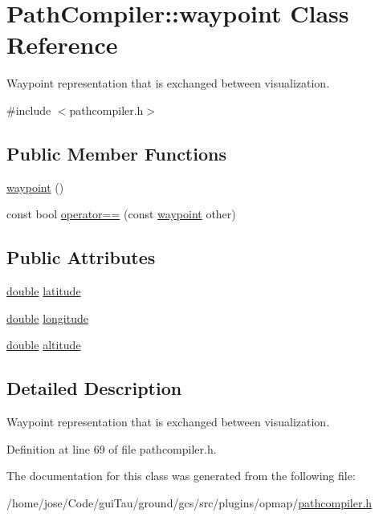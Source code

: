 \hypertarget{class_path_compiler_1_1waypoint}{\section{Path\-Compiler\-:\-:waypoint Class Reference}
\label{class_path_compiler_1_1waypoint}
}


Waypoint representation that is exchanged between visualization.  




{\ttfamily \#include $<$pathcompiler.\-h$>$}

\subsection*{Public Member Functions}
\begin{DoxyCompactItemize}
\item 
\hyperlink{group___o_p_map_plugin_ga9cfe5fa7f47eec99c5410789c9a6fea2}{waypoint} ()
\item 
const bool \hyperlink{group___o_p_map_plugin_ga2f0a3339103075c67e70706180c208e2}{operator==} (const \hyperlink{class_path_compiler_1_1waypoint}{waypoint} other)
\end{DoxyCompactItemize}
\subsection*{Public Attributes}
\begin{DoxyCompactItemize}
\item 
\hyperlink{_super_l_u_support_8h_a8956b2b9f49bf918deed98379d159ca7}{double} \hyperlink{group___o_p_map_plugin_ga78f3936ec843f0060648b9503702acd6}{latitude}
\item 
\hyperlink{_super_l_u_support_8h_a8956b2b9f49bf918deed98379d159ca7}{double} \hyperlink{group___o_p_map_plugin_ga698954b834d77d2eb539e287bc6bc9e0}{longitude}
\item 
\hyperlink{_super_l_u_support_8h_a8956b2b9f49bf918deed98379d159ca7}{double} \hyperlink{group___o_p_map_plugin_ga538be1c7d40ec1ac89c5faad4012154e}{altitude}
\end{DoxyCompactItemize}


\subsection{Detailed Description}
Waypoint representation that is exchanged between visualization. 

Definition at line 69 of file pathcompiler.\-h.



The documentation for this class was generated from the following file\-:\begin{DoxyCompactItemize}
\item 
/home/jose/\-Code/gui\-Tau/ground/gcs/src/plugins/opmap/\hyperlink{pathcompiler_8h}{pathcompiler.\-h}\end{DoxyCompactItemize}
